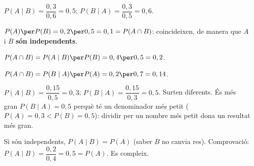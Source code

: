 \begin{solucions}
\begin{sollist}
  \item $P(A\mid B)=\dfrac{0,3}{0,6}=0,5$; $P(B\mid A)=\dfrac{0,3}{0,5}=0,6$.
  \item $P(A)\per P(B)=0,2\per 0,5=0,1=P(A\cap B)$: coincideixen, de manera que $A$ i
        $B$ \textbf{són independents}.
  \item $P(A\cap B)=P(A\mid B)\per P(B)=0,4\per 0,5=0,2$.
  \item $P(A\cap B)=P(B\mid A)\per P(A)=0,2\per 0,7=0,14$.
  \item $P(A\mid B)=\dfrac{0,15}{0,5}=0,3$; $P(B\mid A)=\dfrac{0,15}{0,3}=0,5$. Surten
        diferents. És més gran $P(B\mid A)=0,5$ perquè té un denominador més petit
        ($P(A)=0,3<P(B)=0,5$): dividir per un nombre més petit dona un resultat més gran.
  \item Si són independents, $P(A\mid B)=P(A)$ (saber $B$ no canvia res). Comprovació:
        $P(A\mid B)=\dfrac{0,2}{0,4}=0,5=P(A)$. Es compleix.
\end{sollist}
\end{solucions}
